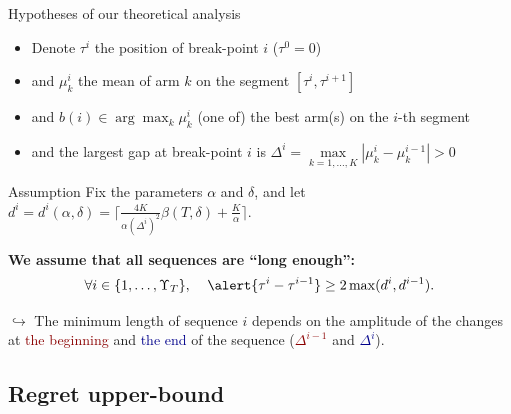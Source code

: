 \documentclass[11pt,english,ignorenonframetext,]{beamer}
\begin{document}
\begin{frame}{Hypotheses of our theoretical analysis}

  \begin{itemize}
    \item
    Denote $\tau^{i}$ the position of break-point $i$ ($\tau^0 = 0$)
    \item
    and $\mu_k^{i}$ the mean of arm $k$ on the segment $[\tau^i, \tau^{i+1}]$
    \item
    and $b(i) \in \arg\max_k \mu_k^{i}$ (one of) the best arm(s) on the $i$-th segment
    \item
    and the largest gap at break-point $i$ is
    $\Delta^{i} = \max\limits_{k=1,\dots,K} |\mu_k^{i} - \mu_k^{i-1}| >0$
  \end{itemize}

  \pause
  \begin{block}{Assumption}
    Fix the parameters $\alpha$ and $\delta$,
    and let $d^{i} = d^{i}(\alpha,\delta) = \lceil \frac{4K}{\alpha(\Delta^{i})^2}\beta(T,\delta) + \frac{K}{\alpha} \rceil$.

    \alert{\textbf{We assume that all sequences are ``long enough'':}}
    \vspace*{-5pt}
    \[ \forall i \in \{1,\dots,\Upsilon_T\}, \;\;\;\; \alert{\tau^{i} - \tau^{i-1}} \geq 2\max( d^{i}, d^{i-1} ). \]
  \end{block}

  \pause
  $\hookrightarrow$
  The \alert{minimum length of sequence $i$} depends on the amplitude of the changes at \textcolor{darkred}{the beginning} and \textcolor{darkblue}{the end} of the sequence (\textcolor{darkred}{$\Delta^{i-1}$} and \textcolor{darkblue}{$\Delta^{i}$}).

\end{frame}


\subsection{\hfill{}Regret upper-bound\hfill{}}
\end{document}
